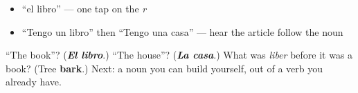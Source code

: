 \begin{itemize}
\raggedright
  \item \textquotedblleft{}el libro\textquotedblright{} — one tap on the \emph{r}
  \item \textquotedblleft{}Tengo un libro\textquotedblright{} then \textquotedblleft{}Tengo una casa\textquotedblright{} — hear the article follow the noun
\end{itemize}

\begin{tcolorbox}[breakable,colback=teal!4,colframe=teal!35!black,title={Before you move on}]
\textquotedblleft{}The book\textquotedblright{}? (\emph{\textbf{El libro}}.) \textquotedblleft{}The house\textquotedblright{}? (\emph{\textbf{La casa}}.) What was \emph{liber} before it was a book? (Tree \textbf{bark}.) Next: a noun you can build yourself, out of a verb you already have.
\end{tcolorbox}
